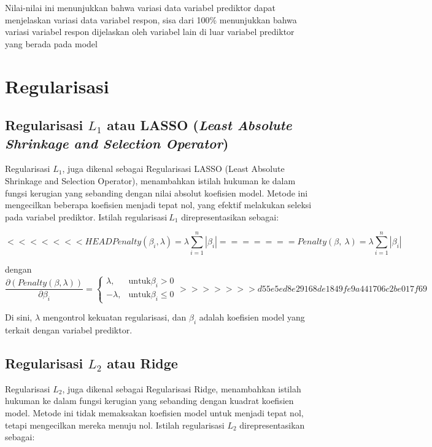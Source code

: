 Nilai-nilai ini menunjukkan bahwa variasi data variabel prediktor dapat
menjelaskan variasi data variabel respon, sisa dari 100\% menunjukkan
bahwa variasi variabel respon dijelaskan oleh variabel lain di luar
variabel prediktor yang berada pada model
%
\section{Regularisasi}
\subsection{Regularisasi $L_1$ atau LASSO (\emph{Least Absolute Shrinkage and Selection Operator})}
Regularisasi \(L_{1}\), juga dikenal sebagai Regularisasi LASSO (Least
Absolute Shrinkage and Selection Operator), menambahkan istilah hukuman
ke dalam fungsi kerugian yang sebanding dengan nilai absolut koefisien
model. Metode ini mengecilkan beberapa koefisien menjadi tepat nol, yang
efektif melakukan seleksi pada variabel prediktor. Istilah
regularisasi\(\ L_{1}\) direpresentasikan sebagai:

\begin{equation}\label{penaltyL1}
<<<<<<< HEAD
    Penalty\left( \beta_{i}, \lambda \right) = \lambda\sum_{i = 1}^{n}\left| \beta_{i} \right|
=======
    Penalty\left( \beta,\ \lambda \right) = \lambda\sum_{i = 1}^{n}\left| \beta_{i} \right|
\end{equation}

dengan
\begin{equation}
	\frac{\partial\left(Penalty(\beta, \lambda) \right)}{\partial\beta_i} = \begin{cases}
		\lambda, & \text{untuk} \beta_i > 0 \\
		-\lambda, & \text{untuk} \beta_i\leq 0
	\end{cases}
>>>>>>> d55e5ed8e29168de1849fe9a441706c2be017f69
\end{equation}

Di sini, \(\lambda\) mengontrol kekuatan regularisasi, dan \(\beta_{i}\)
adalah koefisien model yang terkait dengan variabel prediktor\citep*{Hastie2009}.

%
\subsection{Regularisasi $L_2$ atau Ridge}
Regularisasi \(L_{2}\), juga dikenal sebagai Regularisasi Ridge,
menambahkan istilah hukuman ke dalam fungsi kerugian yang sebanding
dengan kuadrat koefisien model. Metode ini tidak memaksakan koefisien
model untuk menjadi tepat nol, tetapi mengecilkan mereka menuju nol.
Istilah regularisasi \(L_{2}\) direpresentasikan sebagai:


